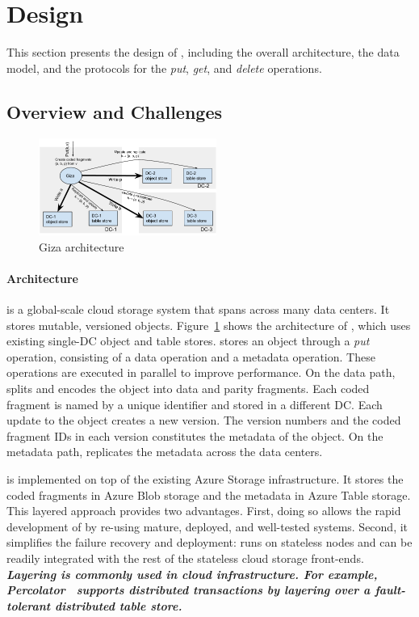 \section{Design}
\label{sec:design}

This section presents the design of {\name}, including the overall architecture,
the data model, and the protocols for the {\em put}, {\em get}, and {\em delete} operations.

\subsection{Overview and Challenges}

\begin{figure}[tp]
\centering
\includegraphics[width=0.52\textwidth]{fig/Giza}
\caption{Giza architecture\label{fig:arch}}
\end{figure}

\paragraph{Architecture}
{\name} is a global-scale cloud storage system that spans across many data
centers. It stores mutable, versioned objects. Figure~\ref{fig:arch} shows the
architecture of \name, which uses existing single-DC object and table stores.
\name stores an object through a {\em put} operation, consisting of a data operation and a metadata operation. These operations are executed in parallel to improve performance. On the data path, \name splits and
encodes the object into data and parity fragments.
Each coded fragment is named by a unique identifier and stored in a different DC.
Each update to the object creates a new version. The version
numbers and the coded fragment IDs in each version constitutes the
metadata of the object. On the metadata path, \name replicates the metadata
across the data centers.

\name is implemented on top of the existing Azure Storage infrastructure.
It stores the coded fragments in Azure Blob storage 
and the metadata in Azure Table storage.
This layered approach provides two advantages. First, doing so allows the rapid
development of \name by re-using mature, deployed, and well-tested systems.
Second, it simplifies the failure recovery and deployment: \name runs on
stateless nodes and can be readily integrated with the rest of the stateless
cloud storage front-ends.  \textit{\textbf{Layering is commonly used in cloud
infrastructure. For example, Percolator~\cite{peng12large} supports distributed 
transactions by layering over a fault-tolerant distributed table store.}}

